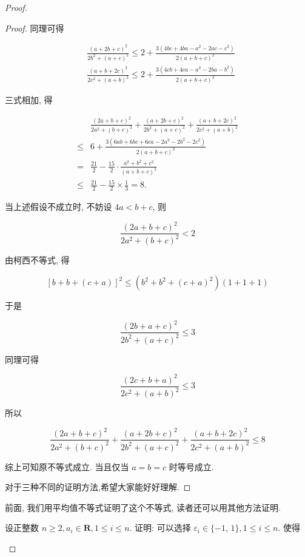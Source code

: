 \begin{proof}
\begin{example}
\begin{proof}
	同理可得
	
	$$
	\begin{aligned}
	& \frac{(a+2 b+c)^{2}}{2 b^{2}+(a+c)^{2}} \leqslant 2+\frac{3\left(4 b c+4 b a-a^{2}-2 a c-c^{2}\right)}{2(a+b+c)^{2}} \\
	& \frac{(a+b+2 c)^{2}}{2 c^{2}+(a+b)^{2}} \leqslant 2+\frac{3\left(4 c b+4 c a-a^{2}-2 b a-b^{2}\right)}{2(a+b+c)^{2}}
	\end{aligned}
	$$
	
	三式相加, 得
	
	$$
	\begin{aligned}
	& \frac{(2 a+b+c)^{2}}{2 a^{2}+(b+c)^{2}}+\frac{(a+2 b+c)^{2}}{2 b^{2}+(a+c)^{2}}+\frac{(a+b+2 c)^{2}}{2 c^{2}+(a+b)^{2}} \\
	\leqslant & 6+\frac{3\left(6 a b+6 b c+6 c a-2 a^{2}-2 b^{2}-2 c^{2}\right)}{2(a+b+c)^{2}} \\
	= & \frac{21}{2}-\frac{15}{2} \cdot \frac{a^{2}+b^{2}+c^{2}}{(a+b+c)^{2}} \\
	\leqslant & \frac{21}{2}-\frac{15}{2} \times \frac{1}{3}=8 .
	\end{aligned}
	$$
	
	当上述假设不成立时, 不妨设 $4 a<b+c$, 则
	
	$$
	\frac{(2 a+b+c)^{2}}{2 a^{2}+(b+c)^{2}}<2
	$$
	
	由柯西不等式, 得
	
	$$
	[b+b+(c+a)]^{2} \leqslant\left(b^{2}+b^{2}+(c+a)^{2}\right)(1+1+1)
	$$
	
	于是
	
	$$
	\frac{(2 b+a+c)^{2}}{2 b^{2}+(a+c)^{2}} \leqslant 3
	$$
	
	同理可得
	
	$$
	\frac{(2 c+b+a)^{2}}{2 c^{2}+(a+b)^{2}} \leqslant 3
	$$
	
	所以
	
	$$
	\frac{(2 a+b+c)^{2}}{2 a^{2}+(b+c)^{2}}+\frac{(a+2 b+c)^{2}}{2 b^{2}+(a+c)^{2}}+\frac{(a+b+2 c)^{2}}{2 c^{2}+(a+b)^{2}} \leqslant 8
	$$
	
	综上可知原不等式成立. 当且仅当 $a=b=c$ 时等号成立.
	
	对于三种不同的证明方法,希望大家能好好理解.
\end{proof}
\begin{note}
	前面, 我们用平均值不等式证明了这个不等式, 读者还可以用其他方法证明.
\end{note}

\begin{example}
	设正整数 $n \geqslant 2, a_{i} \in \mathbf{R}, 1 \leqslant i \leqslant n$. 证明: 可以选择 $\varepsilon_{i} \in\{-1$, $1\}, 1 \leqslant i \leqslant n$. 使得
	

\end{example}
\end{example}
\end{proof}
